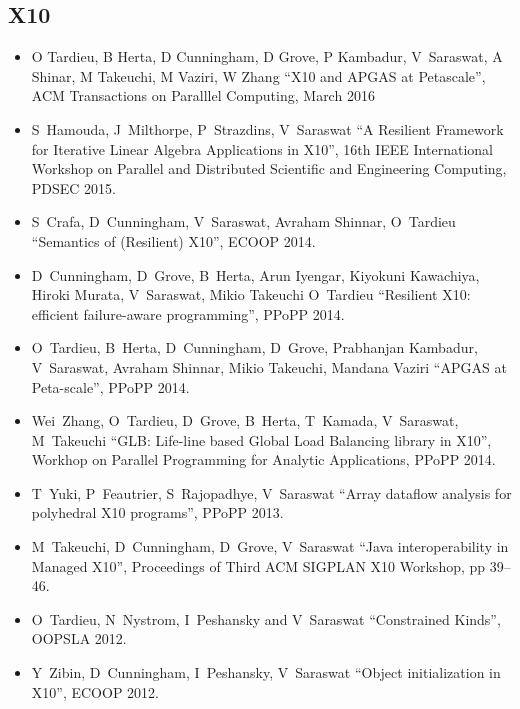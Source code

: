 \documentclass{article}
\begin{document}
\subsection*{X10}
\begin{itemize}
\item O Tardieu, B Herta, D Cunningham, D Grove, P Kambadur,
  V~Saraswat, A Shinar, M Takeuchi, M Vaziri, W Zhang ``X10 and APGAS
  at Petascale'', ACM Transactions on Paralllel Computing, March 2016 

\item S~Hamouda, J~Milthorpe, P~Strazdins, V~Saraswat ``A
  Resilient Framework for Iterative Linear Algebra Applications in
  X10'', 16th IEEE International Workshop on Parallel and Distributed
  Scientific and Engineering Computing, PDSEC 2015.

\item S~Crafa, D~Cunningham, V~Saraswat, Avraham Shinnar,
  O~Tardieu ``Semantics of (Resilient) X10'', ECOOP 2014.

\item D~Cunningham, D~Grove, B~Herta, Arun Iyengar,
  Kiyokuni Kawachiya, Hiroki Murata, V~Saraswat, Mikio Takeuchi
  O~Tardieu ``Resilient X10: efficient failure-aware
  programming'', PPoPP 2014. 

\item O~Tardieu, B~Herta, D~Cunningham, D~Grove,
  Prabhanjan Kambadur, V~Saraswat, Avraham Shinnar, Mikio
  Takeuchi, Mandana Vaziri ``APGAS at Peta-scale'', PPoPP 2014.

\item Wei~Zhang, O~Tardieu, D~Grove, B~Herta, T~Kamada, V~Saraswat, M~Takeuchi  ``GLB: Life-line based
  Global Load Balancing library in X10'', Workhop on Parallel
  Programming for Analytic Applications, PPoPP 2014.

\item T~Yuki, P~Feautrier, S~Rajopadhye, V~Saraswat
  ``Array dataflow analysis for polyhedral X10 programs'', PPoPP 2013.

\item M~Takeuchi, D~Cunningham, D~Grove, V~Saraswat ``Java
interoperability in Managed X10'', Proceedings of Third ACM SIGPLAN
X10 Workshop, pp 39--46. 

\item O~Tardieu, N~Nystrom, I~Peshansky and V~Saraswat
  ``Constrained Kinds'', OOPSLA 2012.
\item Y~Zibin, D~Cunningham, I~Peshansky, V~Saraswat
  ``Object initialization in X10'', ECOOP 2012.


\end{itemize}
\end{document}
